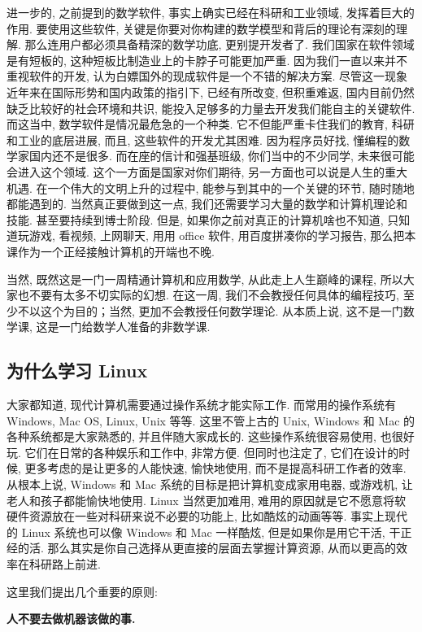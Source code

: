 \documentclass[a4paper]{ctexart}
\begin{document}
进一步的, 之前提到的数学软件, 事实上确实已经在科研和工业领域, 发挥着巨大的作用. 要使用这些软件,
关键是你要对你构建的数学模型和背后的理论有深刻的理解. 那么连用户都必须具备精深的数学功底, 更别提开发者了.
我们国家在软件领域是有短板的, 这种短板比制造业上的卡脖子可能更加严重. 因为我们一直以来并不重视软件的开发,
认为白嫖国外的现成软件是一个不错的解决方案. 尽管这一现象近年来在国际形势和国内政策的指引下, 已经有所改变,
但积重难返, 国内目前仍然缺乏比较好的社会环境和共识, 能投入足够多的力量去开发我们能自主的关键软件. 而这当中,
数学软件是情况最危急的一个种类. 它不但能严重卡住我们的教育, 科研和工业的底层进展, 而且, 这些软件的开发尤其困难.
因为程序员好找, 懂编程的数学家国内还不是很多. 而在座的信计和强基班级, 你们当中的不少同学,
未来很可能会进入这个领域. 这个一方面是国家对你们期待, 另一方面也可以说是人生的重大机遇.
在一个伟大的文明上升的过程中, 能参与到其中的一个关键的环节, 随时随地都能遇到的. 当然真正要做到这一点,
我们还需要学习大量的数学和计算机理论和技能. 甚至要持续到博士阶段. 但是, 如果你之前对真正的计算机啥也不知道,
只知道玩游戏, 看视频, 上网聊天, 用用 office 软件, 用百度拼凑你的学习报告,
那么把本课作为一个正经接触计算机的开端也不晚.

当然, 既然这是一门一周精通计算机和应用数学, 从此走上人生巅峰的课程, 所以大家也不要有太多不切实际的幻想.
在这一周, 我们不会教授任何具体的编程技巧, 至少不以这个为目的；当然, 更加不会教授任何数学理论. 从本质上说,
这不是一门数学课, 这是一门给数学人准备的非数学课. 

\subsection{为什么学习 Linux}
大家都知道, 现代计算机需要通过操作系统才能实际工作. 而常用的操作系统有 Windows, Mac OS, Linux, Unix 等等.
这里不管上古的 Unix, Windows 和 Mac 的各种系统都是大家熟悉的, 并且伴随大家成长的. 这些操作系统很容易使用,
也很好玩. 它们在日常的各种娱乐和工作中, 非常方便. 但同时也注定了, 它们在设计的时候, 更多考虑的是让更多的人能快速,
愉快地使用, 而不是提高科研工作者的效率. 从根本上说, Windows 和 Mac 系统的目标是把计算机变成家用电器, 或游戏机, 
让老人和孩子都能愉快地使用. Linux 当然更加难用, 难用的原因就是它不愿意将软硬件资源放在一些对科研来说不必要的功能上,
比如酷炫的动画等等. 事实上现代的 Linux 系统也可以像 Windows 和 Mac 一样酷炫, 但是如果你是用它干活, 干正经的活.
那么其实是你自己选择从更直接的层面去掌握计算资源, 从而以更高的效率在科研路上前进.

这里我们提出几个重要的原则:

{\bf 人不要去做机器该做的事.}
\end{document}
